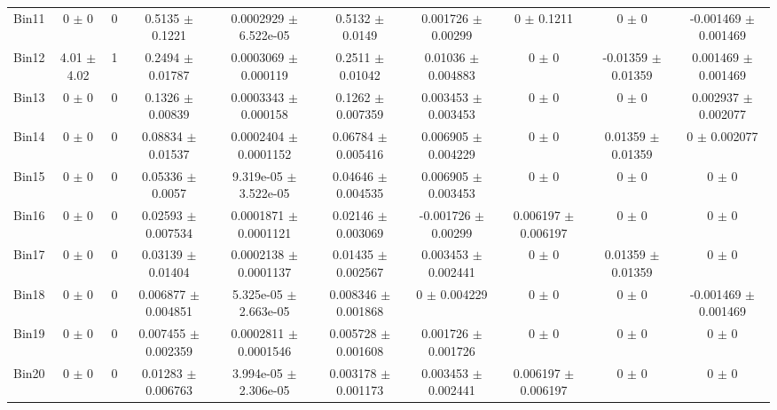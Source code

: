 \begin{tabular}{@{\extracolsep{4pt}}lccccccccc@{}}
     Bin11 & 0 $\pm$ 0 & 0 & 0.5135 $\pm$ 0.1221 & 0.0002929 $\pm$ 6.522e-05 & 0.5132 $\pm$ 0.0149 & 0.001726 $\pm$ 0.00299 & 0 $\pm$ 0.1211 & 0 $\pm$ 0 & -0.001469 $\pm$ 0.001469 \\ 
     Bin12 & 4.01 $\pm$ 4.02 & 1 & 0.2494 $\pm$ 0.01787 & 0.0003069 $\pm$ 0.000119 & 0.2511 $\pm$ 0.01042 & 0.01036 $\pm$ 0.004883 & 0 $\pm$ 0 & -0.01359 $\pm$ 0.01359 & 0.001469 $\pm$ 0.001469 \\ 
     Bin13 & 0 $\pm$ 0 & 0 & 0.1326 $\pm$ 0.00839 & 0.0003343 $\pm$ 0.000158 & 0.1262 $\pm$ 0.007359 & 0.003453 $\pm$ 0.003453 & 0 $\pm$ 0 & 0 $\pm$ 0 & 0.002937 $\pm$ 0.002077 \\ 
     Bin14 & 0 $\pm$ 0 & 0 & 0.08834 $\pm$ 0.01537 & 0.0002404 $\pm$ 0.0001152 & 0.06784 $\pm$ 0.005416 & 0.006905 $\pm$ 0.004229 & 0 $\pm$ 0 & 0.01359 $\pm$ 0.01359 & 0 $\pm$ 0.002077 \\ 
     Bin15 & 0 $\pm$ 0 & 0 & 0.05336 $\pm$ 0.0057 & 9.319e-05 $\pm$ 3.522e-05 & 0.04646 $\pm$ 0.004535 & 0.006905 $\pm$ 0.003453 & 0 $\pm$ 0 & 0 $\pm$ 0 & 0 $\pm$ 0 \\ 
     Bin16 & 0 $\pm$ 0 & 0 & 0.02593 $\pm$ 0.007534 & 0.0001871 $\pm$ 0.0001121 & 0.02146 $\pm$ 0.003069 & -0.001726 $\pm$ 0.00299 & 0.006197 $\pm$ 0.006197 & 0 $\pm$ 0 & 0 $\pm$ 0 \\ 
     Bin17 & 0 $\pm$ 0 & 0 & 0.03139 $\pm$ 0.01404 & 0.0002138 $\pm$ 0.0001137 & 0.01435 $\pm$ 0.002567 & 0.003453 $\pm$ 0.002441 & 0 $\pm$ 0 & 0.01359 $\pm$ 0.01359 & 0 $\pm$ 0 \\ 
     Bin18 & 0 $\pm$ 0 & 0 & 0.006877 $\pm$ 0.004851 & 5.325e-05 $\pm$ 2.663e-05 & 0.008346 $\pm$ 0.001868 & 0 $\pm$ 0.004229 & 0 $\pm$ 0 & 0 $\pm$ 0 & -0.001469 $\pm$ 0.001469 \\ 
     Bin19 & 0 $\pm$ 0 & 0 & 0.007455 $\pm$ 0.002359 & 0.0002811 $\pm$ 0.0001546 & 0.005728 $\pm$ 0.001608 & 0.001726 $\pm$ 0.001726 & 0 $\pm$ 0 & 0 $\pm$ 0 & 0 $\pm$ 0 \\ 
     Bin20 & 0 $\pm$ 0 & 0 & 0.01283 $\pm$ 0.006763 & 3.994e-05 $\pm$ 2.306e-05 & 0.003178 $\pm$ 0.001173 & 0.003453 $\pm$ 0.002441 & 0.006197 $\pm$ 0.006197 & 0 $\pm$ 0 & 0 $\pm$ 0 \\ 
\hline\hline
  \end{tabular}
